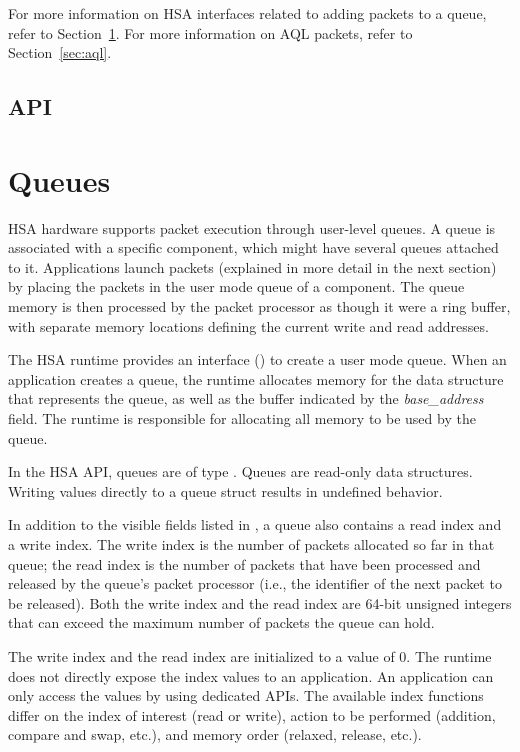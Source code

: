 \documentclass[final]{book}
\newcommand{\reffld}[1]{\textit{#1}}
\begin{document}
For more information on HSA interfaces related to adding packets to a queue, 
refer to Section~\ref{sec:queues}. For more information on AQL packets, refer 
to Section~\ref{sec:aql}.



\subsection{API}


\section{Queues} \label{sec:queues}

HSA hardware supports packet execution through user-level queues. A queue is
associated with a specific component, which might have several queues attached
to it. Applications launch packets (explained in more detail in the next
section) by placing the packets in the user mode queue of a component. The queue 
memory is then processed by the packet processor as though it were a ring buffer, 
with separate memory locations defining the current write and read addresses.

The HSA runtime provides an interface () to create a
user mode queue. When an application creates a queue, the runtime allocates 
memory for the data structure that represents the queue, as well as the buffer 
indicated by the \reffld{base_address} field. The runtime is responsible for 
allocating all memory to be used by the queue.

In the HSA API, queues are of type . Queues are read-only 
data structures. Writing values directly to a queue struct results in 
undefined behavior.

In addition to the visible fields listed in , a queue also
contains a read index and a write index. The write index is the number of
packets allocated so far in that queue; the read index is the number of packets
that have been processed and released by the queue's packet processor (i.e., the
identifier of the next packet to be released). Both the write index and the read 
index are 64-bit unsigned integers that can exceed the maximum number of 
packets the queue can hold.

The write index and the read index are initialized to a value of 0. The runtime 
does not directly expose the index values to an application. An application can 
only access the values by using dedicated APIs.  The available index functions 
differ on the index of interest (read or write), action to be performed 
(addition, compare and swap, etc.), and memory order (relaxed, release, etc.).
\end{document}
